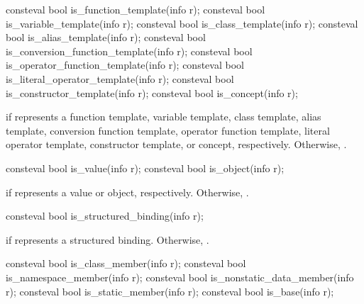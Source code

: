 %
%
%
%
%
%
%
%
%
\begin{itemdecl}
consteval bool is_function_template(info r);
consteval bool is_variable_template(info r);
consteval bool is_class_template(info r);
consteval bool is_alias_template(info r);
consteval bool is_conversion_function_template(info r);
consteval bool is_operator_function_template(info r);
consteval bool is_literal_operator_template(info r);
consteval bool is_constructor_template(info r);
consteval bool is_concept(info r);
\end{itemdecl}

\begin{itemdescr}
\pnum
\returns
{} if  represents a
function template,
variable template,
class template,
alias template,
conversion function template,
operator function template,
literal operator template,
constructor template, or
concept, respectively.
Otherwise, .
\end{itemdescr}

%
%
\begin{itemdecl}
consteval bool is_value(info r);
consteval bool is_object(info r);
\end{itemdecl}

\begin{itemdescr}
\pnum
\returns
{} if  represents a value or object, respectively.
Otherwise, .
\end{itemdescr}

%
\begin{itemdecl}
consteval bool is_structured_binding(info r);
\end{itemdecl}

\begin{itemdescr}
\pnum
\returns
{} if  represents a structured binding.
Otherwise, .
\end{itemdescr}

%
%
%
%
%
\begin{itemdecl}
consteval bool is_class_member(info r);
consteval bool is_namespace_member(info r);
consteval bool is_nonstatic_data_member(info r);
consteval bool is_static_member(info r);
consteval bool is_base(info r);
\end{itemdecl}


